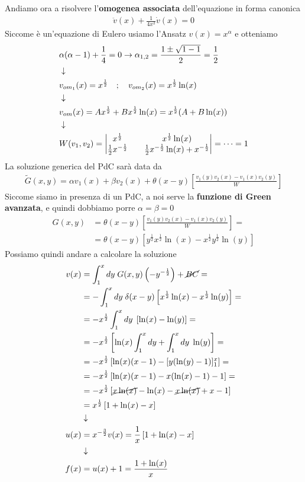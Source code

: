 Andiamo ora a risolvere l'\textbf{omogenea associata} dell'equazione in forma canonica
\begin{align}
	\ddot{v}(x) + \frac{1}{4x^2} \dot{v}(x)  = 0
\end{align}
Siccome è un'equazione di Eulero usiamo l'Ansatz $v(x) = x^\alpha$ e otteniamo
\begin{align}
	&\alpha(\alpha-1) + \frac{1}{4} = 0 \to \alpha_{1,2} = \frac{1\pm \sqrt{1-1}}{2} = \frac{1}{2} \\ &\downarrow \nonumber \\
	&v_{{om}_1}(x) = x^{\frac{1}{2}} \quad ; \quad v_{{om}_2}(x) = x^{\frac{1}{2}} \ln(x) \nonumber \\ &\downarrow \nonumber \\
	&v_{om}(x) = Ax^{\frac{1}{2}} + Bx^{\frac{1}{2}}\ln(x) = x^{\frac{1}{2}}(A + B\ln(x)) \\ &\downarrow \nonumber \\
	&W(v_1,v_2) = \begin{vmatrix}
		x^{\frac{1}{2}} && x^{\frac{1}{2}}\ln(x)\\
		\frac{1}{2} x^{-\frac{1}{2}} && \frac{1}{2} x^{-\frac{1}{2}} \ln(x) + x^{-\frac{1}{2}}
	\end{vmatrix} = \dots = 1
\end{align}
La soluzione generica del PdC sarà data da
\begin{align}
	\tilde{G}(x,y) = \alpha v_1(x) + \beta v_2(x) + \theta(x-y)\left[ \frac{v_1(y) v_2(x) -v_1(x)v_2(y)}{W} \right] 
\end{align}
Siccome siamo in presenza di un PdC, a noi serve la \textbf{funzione di Green avanzata}, e quindi dobbiamo porre $\alpha=\beta=0$
\begin{align}
	G(x,y) &= \theta(x-y)\left[ \frac{v_1(y) v_2(x) -v_1(x)v_2(y)}{W} \right] = \nonumber \\
	&= \theta(x-y)\left[ y^{\frac{1}{2}} x^{\frac{1}{2}} \ln(x) -x^{\frac{1}{2}}y^{\frac{1}{2}} \ln(y) \right] 
\end{align}
Possiamo quindi andare a calcolare la soluzione
\begin{align}
	v(x) &= \int_{1}^{x} dy \; G(x,y) \left( -y^{-\frac{1}{2}} \right) + \cancel{BC} = \nonumber\\
	&= -\int_{1}^{x} dy \; \delta(x-y)\left[ x^{\frac{1}{2}} \ln(x) -x^{\frac{1}{2}} \ln(y) \right]= \nonumber\\
	&= -x^{\frac{1}{2}}\int_{1}^{x} dy \; \left[ \ln(x) - \ln(y) \right] = \nonumber\\
	&= -x^{\frac{1}{2}} \left[\ln(x)\int_{1}^{x} dy + \int_{1}^{x} dy\; \ln(y)\right] = \nonumber\\
	&= -x^{\frac{1}{2}} \left[\ln(x)(x-1) - [y(\ln(y) -1)]_1^x \right] = \nonumber\\
	&= -x^{\frac{1}{2}} \left[\ln(x)(x-1) - x(\ln(x) -1) -1 \right] = \nonumber\\
	&= -x^{\frac{1}{2}} \left[\cancel{x\ln(x)} -\ln(x) - \cancel{x\ln(x)} +x -1 \right] \nonumber\\
	&= x^{\frac{1}{2}} \left[1 +\ln(x)-x \right] \\ &\downarrow \nonumber \\
	u(x) &= x^{-\frac{3}{2}} v(x) = \frac{1}{x} \left[1 +\ln(x)-x \right] \\ &\downarrow \nonumber \\
	f(x) &= u(x) + 1 = \frac{1 + \ln(x)}{x}
\end{align}
